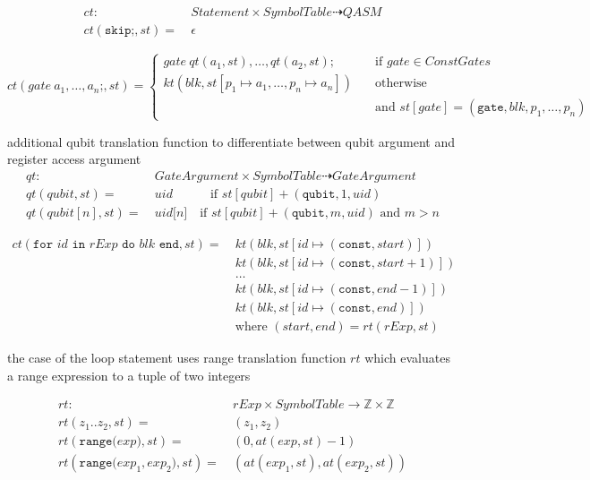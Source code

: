 \begin{align*}
    ct : \ & Statement \times SymbolTable \dashrightarrow QASM\\
    ct(\texttt{skip;}, st) = \ & \epsilon
\end{align*}

\begin{equation*}
    ct(gate \ a_1, \dots, a_n\texttt{;}, st) = 
    \begin{cases}
        gate \ qt(a_1, st), \dots, qt(a_2, st); \quad &\text{if } gate \in ConstGates\\
        kt(blk, st[p_1 \mapsto a_1, \dots, p_n \mapsto a_n]) \quad &\text{otherwise }\\
        &\text{and } st[gate] = (\texttt{gate}, blk, p_1, \dots, p_n)
    \end{cases}
\end{equation*}

additional qubit translation function to differentiate between qubit argument and register access argument
\begin{align*}
    qt :\ & \displaystyle GateArgument \times SymbolTable \dashrightarrow GateArgument\\
    qt(qubit, st) = \ & uid \quad\quad\quad \text{if } st[qubit] + (\texttt{qubit}, 1, uid)\\
    qt(qubit[n], st) = \ & uid\texttt{[}n\texttt{]} \quad \text{if } st[qubit] + (\texttt{qubit}, m, uid) \text{ and } m > n
\end{align*}

\begin{align*}
    ct(\texttt{for } id \texttt{ in } rExp \texttt{ do } blk \texttt{ end}, st) = \ 
        & kt(blk, st[id \mapsto (\texttt{const}, start)])\\
        & kt(blk, st[id \mapsto (\texttt{const}, start + 1)])\\
        & \dots\\
        & kt(blk, st[id \mapsto (\texttt{const}, end - 1)])\\
        & kt(blk, st[id \mapsto (\texttt{const}, end)])\\
        & \text{where } (start, end) = rt(rExp, st)
\end{align*}

the case of the loop statement uses range translation function $rt$ which evaluates a range expression to a tuple of two integers 

\begin{align*}
    rt : \ & rExp \times SymbolTable \to \mathbb{Z} \times \mathbb{Z}\\
    rt(z_1 .. z_2, st)  = \ & (z_1, z_2)\\
    rt(\texttt{range(} exp \texttt{)}, st) = \ & (0, at(exp, st) - 1)\\
    rt(\texttt{range(} exp_1, exp_2 \texttt{)}, st) = \ & (at(exp_1, st), at(exp_2, st))\\
\end{align*}

